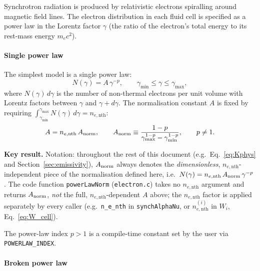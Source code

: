 \documentclass[12pt,a4paper]{article}
\newcommand{\gmin}{\gamma_{\min}}
\newcommand{\gmax}{\gamma_{\max}}
\newcommand{\nenth}{n_{e,\mathrm{nth}}}
\newcommand{\code}[1]{\texttt{#1}}
\newenvironment{keyresult}{%
	\begin{framed}\noindent\textbf{Key result.}\quad}
	{\end{framed}}
\begin{document}
Synchrotron radiation is produced by relativistic electrons spiralling around
magnetic field lines.  The electron distribution in each fluid cell is
specified as a power law in the Lorentz factor $\gamma$ (the ratio of the
electron's total energy to its rest-mass energy $m_e c^2$).

\paragraph{Single power law}
\label{sec:spl}

The simplest model is a single power law:
\begin{equation}
	N(\gamma) = A\,\gamma^{-p}, \qquad \gmin \le \gamma \le \gmax,
	\label{eq:spl}
\end{equation}
where $N(\gamma)\,d\gamma$ is the number of non-thermal electrons per unit
volume with Lorentz factors between $\gamma$ and $\gamma + d\gamma$.  The normalisation constant $A$ is fixed by requiring
$\int_{\gmin}^{\gmax} N(\gamma)\,d\gamma = \nenth$:
\begin{equation}
	A = \nenth\,A_{\rm norm}, \qquad
	A_{\rm norm} \equiv \frac{1-p}{\gmax^{1-p} - \gmin^{1-p}}, \qquad p \ne 1.
	\label{eq:spl_norm}
\end{equation}

\begin{keyresult}
	Notation: throughout the rest of this document (e.g.\ Eq.~\eqref{eq:Kphys}
	and Section~\ref{sec:emissivity}), $A_{\rm norm}$ always denotes the
	\emph{dimensionless}, $\nenth$-independent piece of the normalisation
	defined here, i.e.\ $N(\gamma) = \nenth\,A_{\rm norm}\,\gamma^{-p}$. The
	code function \code{powerLawNorm} (\code{electron.c}) takes no $\nenth$
	argument and returns $A_{\rm norm}$, \emph{not} the full,
	$\nenth$-dependent $A$ above; the $\nenth$ factor is applied separately
	by every caller (e.g.\ \code{n\_e\_nth} in \code{synchAlphaNu}, or
	$\nenth^{(i)}$ in $W_i$, Eq.~\eqref{eq:W_cell}).
\end{keyresult}

The power-law index $p > 1$ is a compile-time constant set by the user via
\code{POWERLAW\_INDEX}.

\paragraph{Broken power law}
\label{sec:bpl}
\end{document}
